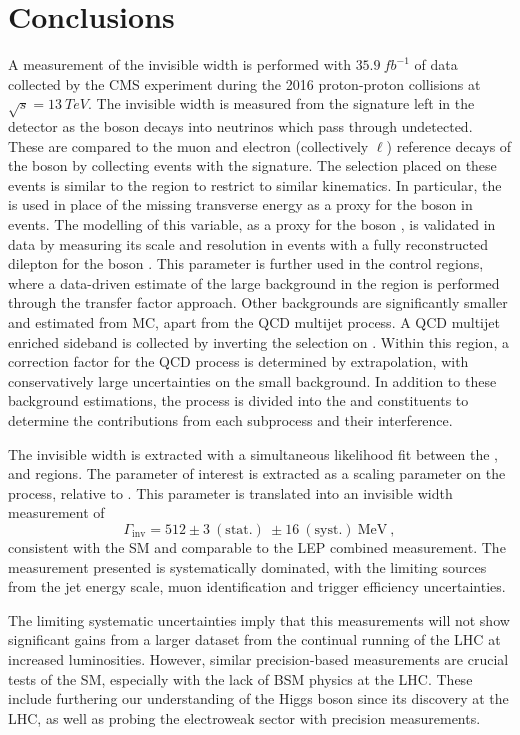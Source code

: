 \chapter{Conclusions}
\label{chap:summary}


A measurement of the \PZ invisible width is performed with
$\SI{35.9}{fb^{-1}}$ of data collected by the CMS experiment during the 2016
proton-proton collisions at $\sqrt{s}=\SI{13}{TeV}$. The invisible width is
measured from the \metplusjets signature left in the detector as the \PZ boson
decays into neutrinos which pass through undetected. These are compared to the
muon and electron (collectively $\ell$) reference decays of the \PZ boson by
collecting events with the \diellplusjets signature. The selection placed on
these events is similar to the \metplusjets region to restrict to similar
kinematics. In particular, the \recoil is used in place of the missing
transverse energy as a proxy for the boson \pt in \IVj events. The modelling
of this variable, as a proxy for the boson \pt, is validated in data by
measuring its scale and resolution in events with a fully reconstructed
dilepton for the boson \pt. This parameter is further used in the \ellplusjets
control regions, where a data-driven estimate of the large \IWlvj background
in the \metplusjets region is performed through the transfer factor approach.
Other backgrounds are significantly smaller and estimated from MC, apart from
the QCD multijet process. A QCD multijet enriched sideband is collected by
inverting the selection on \mindphi. Within this region, a correction factor
for the QCD process is determined by extrapolation, with conservatively large
uncertainties on the small background. In addition to these background
estimations, the \IDYll process is divided into the \IZll and \Igstarll
constituents to determine the contributions from each subprocess and their
interference.

The invisible width is extracted with a simultaneous likelihood fit between
the \metplusjets, \ellplusjets and \diellplusjets regions. The parameter of
interest is extracted as a scaling parameter on the \IZvvj process, relative to \IZllj.
This parameter is translated into an invisible width measurement of
%
\begin{equation}
    \Gamma_{\mathrm{inv}} = 512 \pm 3\ (\mathrm{stat.})\ \pm 16\ (\mathrm{syst.})\ \mathrm{MeV}\ ,
\end{equation}
%
consistent with the SM and comparable to the LEP combined measurement. The measurement presented is systematically
dominated, with the limiting sources from the jet energy scale, muon
identification and trigger efficiency uncertainties.

The limiting systematic uncertainties imply that this measurements will not
show significant gains from a larger dataset from the continual running of the
LHC at increased luminosities. However, similar precision-based measurements
are crucial tests of the SM, especially with the lack of BSM physics at the LHC. 
These include furthering our understanding of the Higgs boson since its
discovery at the LHC, as well as probing the electroweak sector with precision
measurements.